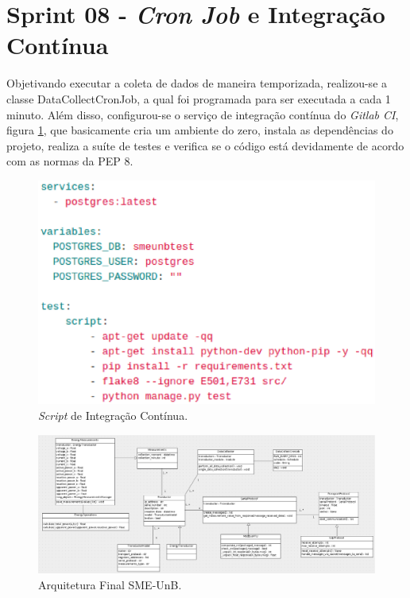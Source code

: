 \section{Sprint 08 - \textit{Cron Job} e Integração Contínua}
Objetivando executar a coleta de dados de maneira temporizada, realizou-se a classe DataCollectCronJob, a qual foi programada para ser executada a cada 1 minuto. Além disso, configurou-se o serviço de integração contínua do \textit{Gitlab CI}, figura \ref{gitlabci}, que basicamente cria um ambiente do zero, instala as dependências do projeto, realiza a suíte de testes e verifica se o código está devidamente de acordo com as normas da PEP 8.
\begin{figure}[!htpb]
    \centering
    \includegraphics[keepaspectratio=true,scale=0.6]{figuras/gitlabci.eps}
    \caption{\textit{Script} de Integração Contínua. }
    \label{gitlabci}
\end{figure}

\begin{figure}[!htpb]
    \centering
    \includegraphics[scale=0.4,angle=90]{figuras/sprint08arq.eps}
    \caption{Arquitetura Final SME-UnB. }
    \label{sprint08arq}
\end{figure}

